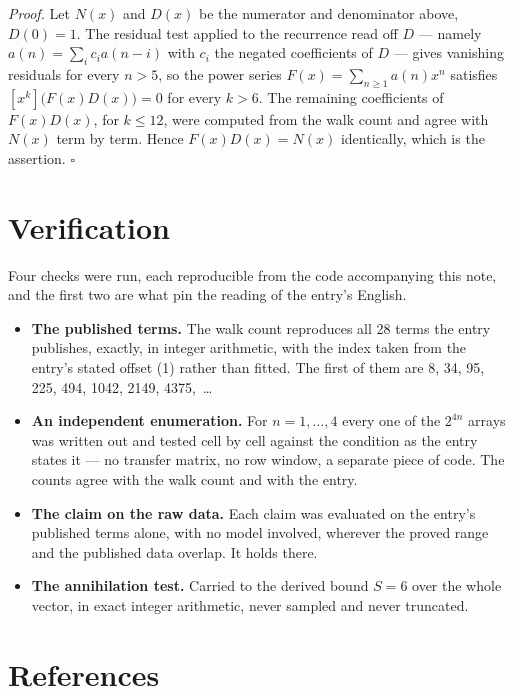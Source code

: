 \documentclass[11pt]{article}
\theoremstyle{definition}
\begin{document}
{\itshape Proof.} Let $N(x)$ and $D(x)$ be the numerator and denominator above, $D(0)=1$. The residual test applied to the recurrence read off $D$ --- namely $a(n) = \sum_i c_i a(n-i)$ with $c_i$ the negated coefficients of $D$ --- gives vanishing residuals for every $n > 5$, so the power series $F(x)=\sum_{n\ge 1}a(n)x^n$ satisfies $[x^k]\bigl(F(x)D(x)\bigr) = 0$ for every $k > 6$. The remaining coefficients of $F(x)D(x)$, for $k \le 12$, were computed from the walk count and agree with $N(x)$ term by term. Hence $F(x)D(x) = N(x)$ identically, which is the assertion. $\square$

\section{Verification}

Four checks were run, each reproducible from the code accompanying this note, and the first two are what pin the reading of the entry's English.

\begin{itemize}

\item {\bfseries The published terms.} The walk count reproduces all 28 terms the entry publishes, exactly, in integer arithmetic, with the index taken from the entry's stated offset (1) rather than fitted. The first of them are 8, 34, 95, 225, 494, 1042, 2149, 4375,~\dots

\item {\bfseries An independent enumeration.} For $n = 1,\dots,4$ every one of the $2^{4n}$ arrays was written out and tested cell by cell against the condition as the entry states it --- no transfer matrix, no row window, a separate piece of code. The counts agree with the walk count and with the entry.

\item {\bfseries The claim on the raw data.} Each claim was evaluated on the entry's published terms alone, with no model involved, wherever the proved range and the published data overlap. It holds there.

\item {\bfseries The annihilation test.} Carried to the derived bound $S = 6$ over the whole vector, in exact integer arithmetic, never sampled and never truncated.

\end{itemize}

\section{References}
\end{document}
